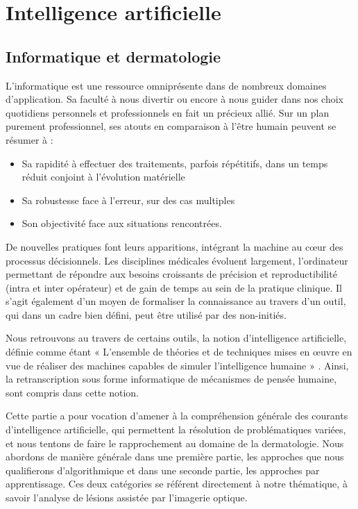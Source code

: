 \chapter{Intelligence artificielle}
\label{chap:chapter_3}
\section{Informatique et dermatologie}
L’informatique est une ressource omniprésente dans de nombreux domaines d’application. Sa faculté à nous divertir ou encore à nous guider dans nos choix quotidiens personnels et professionnels en fait un précieux allié. Sur un plan purement professionnel, ses atouts en comparaison à l’être humain peuvent se résumer à :
\begin{itemize}
    \item Sa rapidité à effectuer des traitements, parfois répétitifs, dans un temps réduit conjoint à l’évolution matérielle
	\item Sa robustesse face à l’erreur, sur des cas multiples
	\item Son objectivité face aux situations rencontrées.
\end{itemize}
De nouvelles pratiques font leurs apparitions, intégrant la machine au cœur des processus décisionnels. Les disciplines médicales évoluent largement, l’ordinateur permettant de répondre aux besoins croissants de précision et reproductibilité (intra et inter opérateur) et de gain de temps au sein de la pratique clinique. Il s’agit également d’un moyen de formaliser la connaissance au travers d’un outil, qui dans un cadre bien défini, peut être utilisé par des non-initiés.\par
Nous retrouvons au travers de certains outils, la notion d’intelligence artificielle, définie comme étant « L’ensemble de théories et de techniques mises en œuvre en vue de réaliser des machines capables de simuler l'intelligence humaine » . Ainsi, la retranscription sous forme informatique de mécanismes de pensée humaine, sont compris dans cette notion.\par
Cette partie a pour vocation d’amener à la compréhension générale des courants d’intelligence artificielle, qui permettent la résolution de problématiques variées, et nous tentons de faire le rapprochement au domaine de la dermatologie. Nous abordons de manière générale dans une première partie, les approches que nous qualifierons d’algorithmique et dans une seconde partie, les approches par apprentissage. Ces deux catégories se référent directement à notre thématique, à savoir l’analyse de lésions assistée par l’imagerie optique.\par
 

